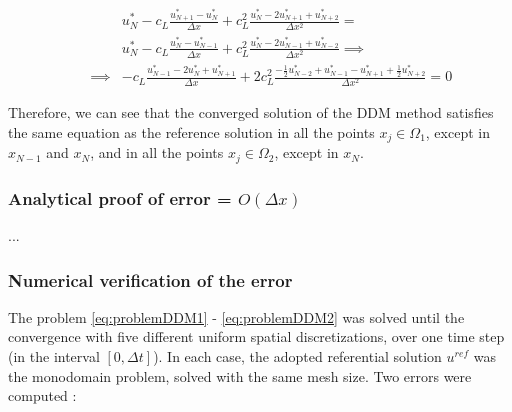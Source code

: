 \begin{equation*}
    \label{eq:TBCsCVOmega2}
\begin{aligned}
   && 					&	 u_N^* -  c_L\frac{u_{N+1}^* - u_{N}^*}{\Delta x} + c_L^2 \frac{u_{N}^* - 2u_{N+1}^* + u_{N+2}^*}{\Delta x^2} =  \\
   && 					& u_N^* -  c_L\frac{u_{N}^* - u_{N-1}^*}{\Delta x} + c_L^2 \frac{u_{N}^* - 2u_{N-1}^* + u_{N-2}^*}{\Delta x^2} \implies \\
	&&  \implies	    & -c_L\frac{u_{N-1}^* - 2 u_{N}^* + u_{N+1}^*}{\Delta x} + 2c_L^2\frac{-\frac{1}{2}u_{N-2}^* + u_{N-1}^* - u_{N+1}^* + \frac{1}{2}u_{N+2}^* }{\Delta x^2} = 0 
\end{aligned}
\end{equation*}

\indent Therefore, we can see that the converged solution of the DDM method satisfies the same equation as the reference solution in all the points $x_j \in \Omega_1$, except in $x_{N-1}$ and $x_N$, and in all the points $x_j \in \Omega_2$, except in $x_N$.


%

\subsubsection{Analytical proof of error = $O(\Delta x)$}

...

\subsubsection{Numerical verification of the error}

\indent The problem \eqref{eq:problemDDM1} - \eqref{eq:problemDDM2} was solved until the convergence with five different uniform spatial discretizations, over one time step (in the interval $[0,\Delta t]$). In each case, the adopted referential solution $u^{ref}$ was the monodomain problem, solved with the same mesh size. Two errors were computed : 

